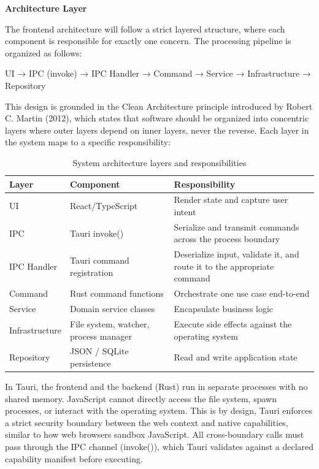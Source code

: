 \documentclass[12pt,oneside,openright,a4paper]{cpe-english-project}
\begin{document}
\textbf{Architecture Layer}

The frontend architecture will follow a strict layered structure, where each component is responsible for exactly one concern. The processing pipeline is organized as follows:
\medskip
\vspace{0.5em}

UI → IPC (invoke) → IPC Handler → Command → Service → Infrastructure → Repository
\medskip
\vspace{0.5em}

This design is grounded in the Clean Architecture principle introduced by Robert C. Martin (2012), which states that software should be organized into concentric layers where outer layers depend on inner layers, never the reverse. Each layer in the system maps to a specific responsibility:

\begin{longtable}{|p{}|p{}|p{}|}
\caption{System architecture layers and responsibilities}\\
\hline
\textbf{Layer} & \textbf{Component} & \textbf{Responsibility} \\
\hline
UI & React/TypeScript & Render state and capture user intent \\
\hline
IPC & Tauri invoke() & Serialize and transmit commands across the process boundary \\
\hline
IPC Handler & Tauri command registration & Deserialize input, validate it, and route it to the appropriate command \\
\hline
Command & Rust command functions & Orchestrate one use case end-to-end \\
\hline
Service & Domain service classes & Encapsulate business logic \\
\hline
Infrastructure & File system, watcher, process manager & Execute side effects against the operating system \\
\hline
Repository & JSON / SQLite persistence & Read and write application state \\
\hline
\end{longtable}

In Tauri, the frontend and the backend (Rust) run in separate processes with no shared memory. JavaScript cannot directly access the file system, spawn processes, or interact with the operating system. This is by design, Tauri enforces a strict security boundary between the web context and native capabilities, similar to how web browsers sandbox JavaScript. All cross-boundary calls must pass through the IPC channel (invoke()), which Tauri validates against a declared capability manifest before executing.
\end{document}
